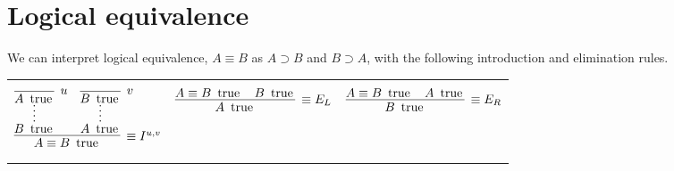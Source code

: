 \documentclass[11pt,letterpaper]{article}
\DeclareMathOperator{\trueP}{\text{ true}}
\renewcommand{\t}{\trueP{}}
\begin{document}
\section{Logical equivalence}

We can interpret logical equivalence,
$A \equiv B$
as $A \supset B$ and $B \supset A$, with the following introduction and
elimination rules.

\begin{center}
    \begin{tabular}{c c c}
        $$
        \infer[\equiv I^{u,v}]{A \equiv B \t}{
            \infer*{B\t}{
                \infer[u]{A\t}{}
            }
            &
            \infer*{A\t}{
                \infer[v]{B\t}{}
            }
        }
        $$
        &
        $$
        \infer[\equiv E_L]{A\t}{
            A \equiv B \t
            &
            B \t
        }
        $$
        &
        $$
        \infer[\equiv E_R]{B\t}{
            A \equiv B \t
            &
            A \t
        }
        $$
    \end{tabular}
\end{center}

\newcommand{\equivproofterm}[6]{
    \left \langle
        \lambda #1 : #2 . #3,
        \lambda #4 : #5 . #6
    \right\rangle : #2 \equiv #5
}
\end{document}
